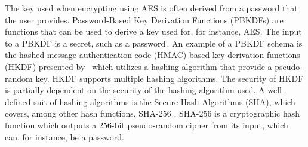 The key used when encrypting using AES is often derived from a password that the user provides. Password-Based Key Derivation Functions (PBKDFs) are functions that can be used to derive a key used for, for instance, AES. The input to a PBKDF is a secret, such as a password\,\cite{kodwaniSecurityKeyDerivation2021}. An example of a PBKDF schema is the hashed message authentication code (HMAC) based key derivation functions (HKDF) presented by \citeauthor{krawczykCryptographicExtractionKey2010}\,\cite{krawczykCryptographicExtractionKey2010}\cite{krawczykHMACbasedExtractandExpandKey2010} which utilizes a hashing algorithm that provide a pseudo-random key. HKDF supports multiple hashing algorithms. The security of HKDF is partially dependent on the security of the hashing algorithm used. A well-defined suit of hashing algorithms is the Secure Hash Algorithms (SHA), which covers, among other hash functions, SHA-256 \cite{hansenUSSecureHash2011}. SHA-256 is a cryptographic hash function which outputs a 256-bit pseudo-random cipher from its input, which can, for instance, be a password.
